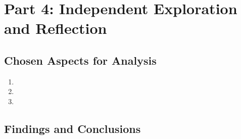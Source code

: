 \documentclass[12pt]{article}
\begin{document}
\newpage

\section*{Part 4: Independent Exploration and Reflection}

\subsection*{Chosen Aspects for Analysis}
\begin{enumerate}
    \item %
    \item %
    \item %
\end{enumerate}

\subsection*{Findings and Conclusions}

\end{document}

